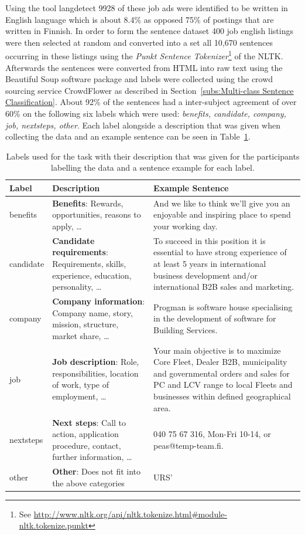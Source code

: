 Using the tool \gls{langdetect} 9928 of these job ads were identified to be written in English language which is about 8.4\% as opposed 75\% of postings that are written in Finnish.
In order to form the sentence dataset 400 job english listings were then selected at random and converted into a set all 10,670 sentences occurring in these listings using the \emph{Punkt Sentence Tokenizer}\footnote{See \url{http://www.nltk.org/api/nltk.tokenize.html\#module-nltk.tokenize.punkt}} of the \gls{NLTK}. Afterwards the sentences were converted from HTML into raw text using the \gls{Beautiful Soup} software package and labels were collected using the \gls{crowd sourcing} service \gls{CrowdFlower} as described in Section~\ref{subs:Multi-class Sentence Classification}. About 92\% of the sentences had a inter-subject agreement of over 60\% on the following six labels which were used: \emph{benefits, candidate, company, job, nextsteps, other}. Each label alongside a description that was given when collecting the data and an example sentence can be seen in Table~\ref{tab:Labels, Description, Example Sentences}.

\begin{table}[h]
  \begin{center}
  \begin{tabularx}{\textwidth}{l | X | X}
    \toprule
    Label & Description & Example Sentence \\
    \midrule
    benefits & \textbf{Benefits}: Rewards, opportunities, reasons to apply, \ldots & And we like to think we’ll give you an enjoyable and inspiring place to spend your working day. \\
    candidate & \textbf{Candidate requirements}: Requirements, skills, experience, education, personality, \ldots & To succeed in this position it is essential to have strong experience of at least 5 years in international business development and/or international B2B sales and marketing. \\
    company & \textbf{Company information}: Company name, story, mission, structure, market share, \ldots & Progman is software house specialising in the development of software for Building Services. \\
    job & \textbf{Job description}: Role, responsibilities, location of work, type of employment, \ldots & Your main objective is to maximize Core Fleet, Dealer B2B, municipality and governmental orders and sales for PC and LCV range to local Fleets and businesses within defined geographical area. \\
    nextsteps & \textbf{Next steps}: Call to action, application procedure, contact, further information, \ldots & 040 75 67 316, Mon-Fri 10-14, or peas@temp-team.fi. \\
    other & \textbf{Other}: Does not fit into the above categories & URS’ \\
    \bottomrule
  \end{tabularx}
  \caption{Labels used for the task with their description that was given for the participants labelling the data and a sentence example for each label.}
\label{tab:Labels, Description, Example Sentences}
\end{center}
\end{table}

